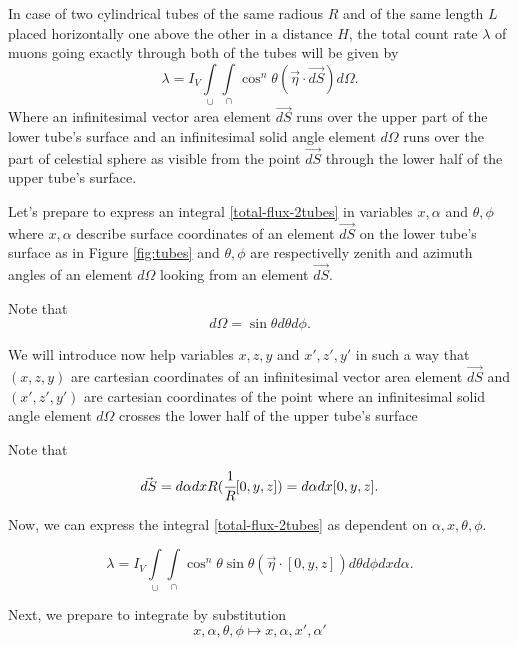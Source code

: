 \documentclass[main.tex]{subfiles}
\begin{document}
In case of two cylindrical tubes of the same radious $R$ and of the same length $L$ placed horizontally one above the other in a distance $H$, the total count rate $\lambda$ of muons going exactly through both of the tubes will be given by
\begin{equation}
\label{total-flux-2tubes}
\lambda = I_V\int\limits_{\cup} \int\limits_{\cap}\cos^n\theta (\vec{\eta}\cdot \vec{dS})d\Omega.
\end{equation}
Where an infinitesimal vector area element $\vec{dS}$ runs over the upper part of the lower tube's surface and an infinitesimal solid angle element $d\Omega$ runs over the part of celestial sphere as visible from the point $\vec{dS}$ through the lower half of the upper tube's surface. 

Let's prepare to express an integral \ref{total-flux-2tubes} in variables $x, \alpha$ and $\theta, \phi$ where $x, \alpha$ describe surface coordinates of an element $\vec{dS}$ on the lower tube's surface as in Figure \ref{fig:tubes} and $\theta, \phi$ are respectivelly zenith and azimuth angles of an element $d\Omega$ looking from an element $\vec{dS}$. 

Note that
\begin{equation}
d\Omega = \sin\theta d\theta d\phi.
\end{equation}

We will introduce now help variables $x,z,y$ and $x', z',y'$ in such a way that $(x,z,y)$ are cartesian coordinates of an infinitesimal vector area element $\vec{dS}$ and $(x',z',y')$ are cartesian coordinates of the point where an infinitesimal solid angle element $d\Omega$ crosses the lower half of the upper tube's surface

Note that 
\begin{equation}
\vec{dS} = d\alpha dx R (\cfrac{1}{R}[0,y,z]) = d\alpha dx [0,y,z].
\end{equation}

Now, we can express the integral \ref{total-flux-2tubes} as dependent on $\alpha, x, \theta, \phi$.

\begin{equation}
\label{total-flux-2tubes-2}
\lambda = I_V\int\limits_{\cup} \int\limits_{\cap}\cos^n\theta\sin\theta (\vec{\eta}\cdot [0,y,z]) d\theta d\phi dxd\alpha.
\end{equation}

Next, we prepare to integrate by substitution
\begin{equation}
\label{flux-substitution}
x, \alpha, \theta, \phi \mapsto x,\alpha, x', \alpha'
\end{equation}
\end{document}
